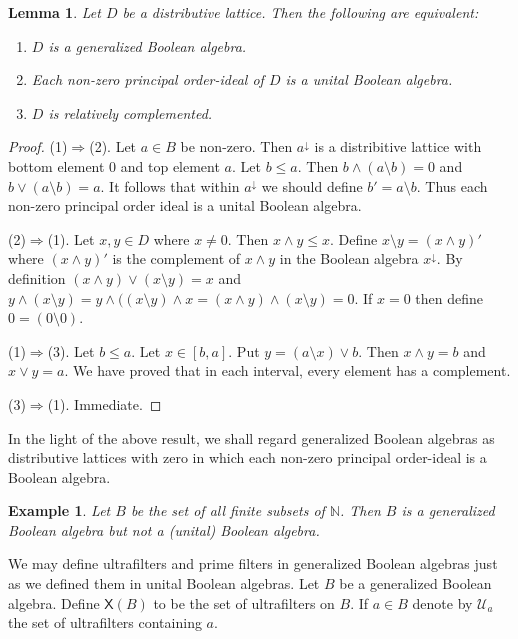 \documentclass[a4paper]{amsart}
\newtheorem{lemma}[theorem]{Lemma}
\newtheorem{example}[theorem]{Example}
\begin{document}
\begin{lemma}\label{lem:gen-ba} 
Let $D$ be a distributive lattice.
Then the following are equivalent:
\begin{enumerate}
\item $D$ is a generalized Boolean algebra.
\item Each non-zero principal order-ideal of $D$ is a unital Boolean algebra.
\item $D$ is relatively complemented.
\end{enumerate}
\end{lemma} 
\begin{proof} 
(1)$\Rightarrow$(2). Let $a \in B$ be non-zero. 
Then $a^{\downarrow}$ is a distribitive lattice with bottom element $0$ and top element $a$.
Let $b \leq a$.
Then $b \wedge (a \setminus b) = 0$ and $b \vee (a \setminus b) = a$.
It follows that within $a^{\downarrow}$ we should define $b' = a \setminus b$.
Thus each non-zero principal order ideal is a unital Boolean algebra. 

(2)$\Rightarrow$(1).
Let $x,y \in D$
where $x \neq 0$.
Then $x \wedge y \leq x$.
Define $x \setminus y = (x \wedge y)'$ where $(x \wedge y)'$ is the complement of $x \wedge y$ in the Boolean algebra $x^{\downarrow}$.
By definition $(x \wedge y) \vee (x \setminus y) = x$
and $y \wedge (x \setminus y) = y \wedge ((x \setminus y) \wedge x = (x \wedge y) \wedge (x \setminus y) = 0$.
If $x = 0$ then define $0 = (0 \setminus 0)$.

(1)$\Rightarrow$(3).
Let $b \leq a$.
Let $x \in [b,a]$.
Put $y = (a \setminus x) \vee b$.
Then $x \wedge y = b$ and $x \vee y = a$.
We have proved that in each interval, every element has a complement.

(3)$\Rightarrow$(1). Immediate.
\end{proof}

In the light of the above result, we shall regard generalized Boolean algebras as
distributive lattices with zero in which each non-zero principal order-ideal
is a Boolean algebra.

\begin{example}{\em Let $B$ be the set of all finite subsets of $\mathbb{N}$.
Then $B$ is a generalized Boolean algebra but not a (unital) Boolean algebra.}
\end{example}

We may define ultrafilters and prime filters in generalized Boolean algebras just as we defined them in unital Boolean algebras.
Let $B$ be a generalized Boolean algebra.
Define $\mathsf{X}(B)$ to be the set of ultrafilters on $B$.
If $a \in B$ denote by $\mathscr{U}_{a}$ the set of ultrafilters containing $a$.
\end{document}
